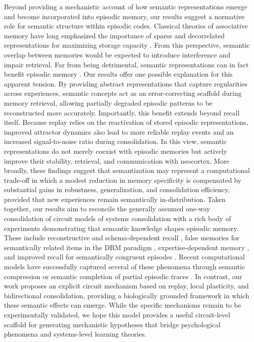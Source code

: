 \documentclass{article}
\begin{document}
Beyond providing a mechanistic account of how semantic representations emerge and become incorporated into episodic memory, our results suggest a normative role for semantic structure within episodic codes. Classical theories of associative memory have long emphasized the importance of sparse and decorrelated representations for maximizing storage capacity . From this perspective, semantic overlap between memories would be expected to introduce interference and impair retrieval. Far from being detrimental, semantic representations can in fact benefit episodic memory . Our results offer one possible explanation for this apparent tension. By providing abstract representations that capture regularities across experiences, semantic concepts act as an error-correcting scaffold during memory retrieval, allowing partially degraded episodic patterns to be reconstructed more accurately. Importantly, this benefit extends beyond recall itself. Because replay relies on the reactivation of stored episodic representations, improved attractor dynamics also lead to more reliable replay events and an increased signal-to-noise ratio during consolidation. In this view, semantic representations do not merely coexist with episodic memories but actively improve their stability, retrieval, and communication with neocortex. More broadly, these findings suggest that semantization may represent a computational trade-off in which a modest reduction in memory specificity is compensated by substantial gains in robustness, generalization, and consolidation efficiency, provided that new experiences remain semantically in-distribution.
\newline\newline
Taken together, our results aim to reconcile the generally assumed one-way consolidation of circuit models of systems consolidation  with a rich body of experiments demonstrating that semantic knowledge shapes episodic memory. These include reconstructive and schema-dependent recall , false memories for semantically related items in the DRM paradigm , expertise-dependent memory , and improved recall for semantically congruent episodes . Recent computational models have successfully captured several of these phenomena through semantic compression  or semantic completion of partial episodic traces . In contrast, our work proposes an explicit circuit mechanism based on replay, local plasticity, and bidirectional consolidation, providing a biologically grounded framework in which these semantic effects can emerge. While the specific mechanisms remain to be experimentally validated, we hope this model provides a useful circuit-level scaffold for generating mechanistic hypotheses that bridge psychological phenomena and systems-level learning theories.
\end{document}
